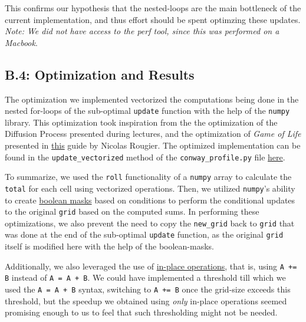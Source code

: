 \documentclass[a4paper,12pt]{article}
\begin{document}
This confirms our hypothesis that the nested-loops are the main bottleneck of the current implementation, and thus effort should be spent optimzing these updates. \\
\textit{Note: We did not have access to the perf tool, since this was performed on a Macbook}.

\subsection{B.4: Optimization and Results}
\label{sec:b4}
The optimization we implemented vectorized the computations being done in the nested for-loops of the sub-optimal \verb|update| function with the help of the \verb|numpy| library. This optimization took inspiration from the the optimization of the Diffusion Process presented during lectures, and the optimization of \textit{Game of Life} presented in \href{https://www.labri.fr/perso/nrougier/from-python-to-numpy/}{this} guide by Nicolas Rougier. The optimized implementation can be found in the \verb|update_vectorized| method of the \verb|conway_profile.py| file \href{https://github.com/paulmyr/DD2358-HPC25/blob/master/02_hpcds/bonus/conway_profile.py}{here}.

To summarize, we used the \verb|roll| functionality of a \verb|numpy| array to calculate the \verb|total| for each cell using vectorized operations. Then, we utilized \verb|numpy|'s ability to create \underline{boolean masks} based on conditions to perform the conditional updates to the original \verb|grid| based on the computed sums. In performing these optimizations, we also prevent the need to copy the \verb|new_grid| back to \verb|grid| that was done at the end of the sub-optimal \verb|update| function, as the original \verb|grid| itself is modified here with the help of the boolean-masks. 

Additionally, we also leveraged the use of \underline{in-place operations}, that is, using \verb|A += B| instead of \verb|A = A + B|. We could have implemented a threshold till which we used the \verb|A = A + B| syntax, switching to \verb|A += B| once the grid-size exceeds this threshold, but the speedup we obtained using \textit{only} in-place operations seemed promising enough to us to feel that such thresholding might not be needed. 
\end{document}
